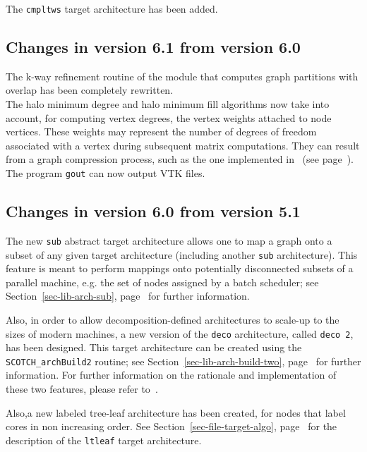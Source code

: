 The \texttt{cmpltws} target architecture has been added.

\subsection{Changes in version 6.1 from version 6.0}

The k-way refinement routine of the module that computes graph
partitions with overlap has been completely rewritten.
\\

The halo minimum degree and halo minimum fill algorithms now take into
account, for computing vertex degrees, the vertex weights attached to
node vertices. These weights may represent the number of degrees of
freedom associated with a vertex during subsequent matrix
computations. They can result from a graph compression process, such
as the one implemented in \scotch\ (see
page~\pageref{sec-lib-meth-compress}).
\\

The program \texttt{gout} can now output VTK files.

\subsection{Changes in version 6.0 from version 5.1}

The new \texttt{sub} abstract target architecture allows one to map a
graph onto a subset of any given target architecture (including
another \texttt{sub} architecture). This feature is meant to perform
mappings onto potentially disconnected subsets of a parallel machine,
e.g. the set of nodes assigned by a batch scheduler; see
Section~\ref{sec-lib-arch-sub}, page~\pageref{sec-lib-arch-sub} for
further information.

Also, in order to allow decomposition-defined architectures to
scale-up to the sizes of modern machines, a new version of the
\texttt{deco} architecture, called \texttt{deco~2}, has been
designed. This target architecture can be created using the
\texttt{SCOTCH\_\lbt arch\lbt Build2} routine; see
Section~\ref{sec-lib-arch-build-two},
page~\pageref{sec-lib-arch-build-two} for further information.
For further information on the rationale and implementation of these
two features, please refer to~\cite{pellegrini:hal-01671156}.

Also,a new labeled tree-leaf architecture has been created, for nodes
that label cores in non increasing order. See
Section~\ref{sec-file-target-algo},
page~\pageref{sec-file-target-algo} for the description of the
\texttt{ltleaf} target architecture.
\\

